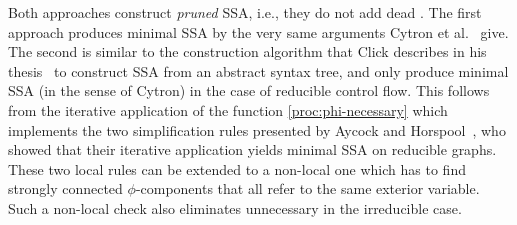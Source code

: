{Both approaches construct \emph{pruned} SSA, i.e., they do not add dead \phifuns.
The first approach produces minimal SSA by the very same arguments Cytron et al.~\cite{cytron:1991:ssa} give.
The second is similar to the construction algorithm that Click describes in his thesis~\cite{click:thesis} to construct SSA from an abstract syntax tree, and only produce minimal SSA (in the sense of Cytron) in the case of reducible control flow.
This follows from the iterative application of the function \ref{proc:phi-necessary} which implements the two simplification rules presented by Aycock and Horspool~\cite{Aycock_Horspool_2000},
who showed that their iterative application yields minimal SSA on reducible graphs.
These two local rules can be extended to a non-local one which has to find strongly connected $\phi$-components that all refer to the same exterior variable.
Such a non-local check also eliminates unnecessary \phifuns in the irreducible case.

}
